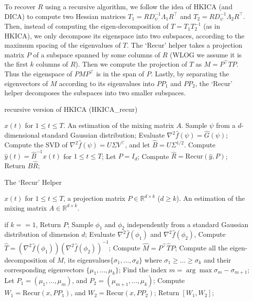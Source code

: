 \documentclass[twoside,11pt]{article}
\newcommand{\real}{\mathbb{R}}
\newcommand{\R}{\real}
\begin{document}
To recover $R$ using a recursive algorithm, we follow the idea of HKICA (and DICA) to compute two Hessian matrices $T_1 = RD_{\psi}^{-1}\Lambda_1R^{\top}$ and $T_2 = RD_{\psi}^{-1}\Lambda_2R^{\top}$. 
Then, instead of computing the eigen-decomposition of $T = T_1 T_2^{-1}$ (as in HKICA), we only decompose its eigenspace into two subspaces, according to the maximum spacing of the eigenvalues of $T$. 
The `Recur' helper takes a projection matrix $P$ of a subspace spanned
by some columns of $R$ (WLOG we assume it is the first $k$ columns of $R$). Then we compute the projection of $T$ as $M = P^{\top}TP$. Thus the eigenspace of $PMP^{\top}$ is in the span of $P$. 
Lastly, by separating the eigenvectors of $M$ according to its eigenvalues into $PP_1$ and $PP_2$, the `Recur' helper decomposes the subspaces into two smaller subspaces.  

\begin{algorithm} 
\caption{recursive version of HKICA (HKICA\_recur)}
\label{alg:HKICA_recur}
\begin{algorithmic}[1]
\INPUT $x(t)$ for $1\le t \le T$. 
\OUTPUT An estimation of the mixing matrix $A$. 
\STATE Sample $\psi$ from a $d$-dimensional standard Gaussian distribution;
\STATE Evaluate $\nabla^2\hat{f}(\psi) = \hat{G}(\psi)$; \\
\STATE Compute the SVD of $\nabla^2\hat{f}(\psi) = U \Sigma V^{\top}$, and let $\hat{B} =  U \Sigma^{1/2}$.
\STATE Compute $\hat{y}(t) = \hat{B}^{-1}x(t)$ for $1\le t \le T$;
\STATE Let $P = I_d$;
\STATE Compute $\hat{R} = \text{Recur}(\hat{y}, P)$;
\STATE Return $\hat{B}\hat{R}$;
\end{algorithmic}
\end{algorithm}
\begin{algorithm} 
\caption{The `Recur' Helper}
\label{alg:recur}
\begin{algorithmic}[1]
\INPUT $x(t)$ for $1\le t \le T$, a projection matrix $P\in \R^{d\times k}$ ($d\ge k$). 
\OUTPUT An estimation of the mixing matrix $A\in \R^{d\times k}$. 

\STATE if $k==1$, Return $P$;
\STATE Sample $\phi_1$ and $\phi_2$ independently from a standard Gaussian distribution of dimension $d$;
\STATE Evaluate $\nabla^2\hat{f}(\phi_1)$ and $\nabla^2\hat{f}(\phi_2)$, 
\STATE Compute $\hat{T} = (\nabla^2 \hat{f}(\phi_1))(\nabla^2\hat{f}(\phi_2))^{-1}$;
\STATE Compute $\hat{M} = P^{\top} \hat{T} P$;
\STATE Compute all the eigen-decomposition of $\hat{M}$, its eigenvalues$\{\sigma_1,\ldots,\sigma_d\}$ where $\sigma_1\ge\ldots\ge \sigma_k$ and their corresponding eigenvectors $\{\mu_1,\ldots, \mu_k\}$;
\STATE Find the index $m = \arg\max \sigma_m - \sigma_{m+1}$; 
\STATE Let $P_1 = (\mu_1,\ldots,\mu_m)$, and $P_2 = (\mu_{m+1},\ldots,\mu_k)$;
\STATE Compute $W_1 = \text{Recur} (x, PP_1)$, and  $W_2 = \text{Recur} (x, PP_2)$;
\STATE Return $[W_1,W_2]$;
\end{algorithmic}
\end{algorithm}
\end{document}
